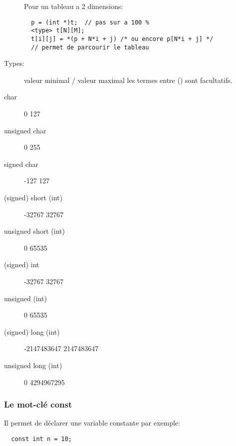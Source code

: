 \documentclass[a4paper]{article}
\begin{document}
\begin{description}
  Pour un tableau a 2 dimensions:
  \begin{lstlisting}
  p = (int *)t;  // pas sur a 100 %
  <type> t[N][M];
  t[i][j] = *(p + N*i + j) /* ou encore p[N*i + j] */
  // permet de parcourir le tableau
  \end{lstlisting}

  \item [Types:]  valeur minimal / valeur maximal  les termes entre \guillemotleft{} () \guillemotright{} sont facultatifs.
  \item [char] 	0 	127
  \item [unsigned char] 	0 	255
  \item [signed char] 	-127 	127
  \item [(signed) short (int)] 	-32767 	32767
  \item [unsigned short (int)]	0 	65535
  \item [(signed) int] 	-32767 	32767
  \item [unsigned (int)] 	0 	65535
  \item [(signed) long (int)] 	-2147483647 	2147483647
  \item [unsigned long (int)] 	0 	4294967295
\end{description}
\subsubsection{Le mot-clé const}
Il permet de déclarer une variable constante par exemple:
\begin{lstlisting}
  const int n = 10;
\end{lstlisting}
\end{document}
